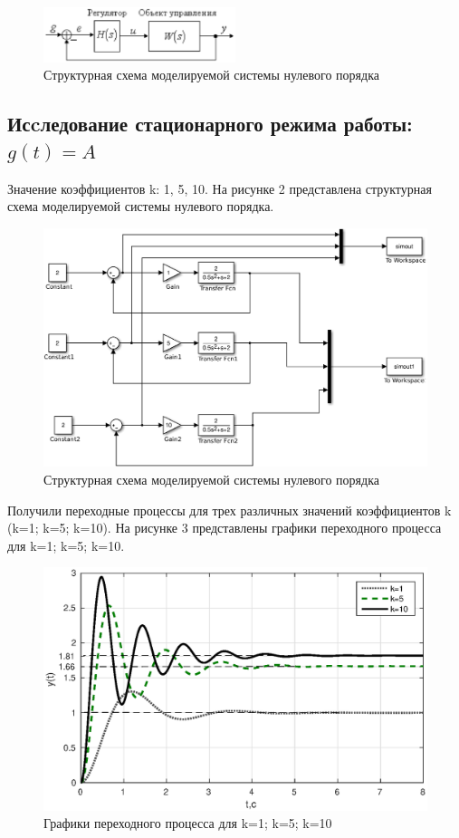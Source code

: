 \documentclass[12pt,a4paper]{article}
\begin{document}
\begin{figure}[h!]
\centering
\includegraphics[width=0.5\textwidth]{1/22.eps} 
\caption{Структурная схема моделируемой  системы нулевого порядка}
\end{figure}

\subsection{Исcледование стационарного режима работы: $g(t)=A$}

Значение коэффициентов k: 1, 5, 10.
На рисунке 2 представлена структурная схема моделируемой системы нулевого порядка.
\begin{figure}[h!]
\centering
\includegraphics[width=\textwidth]{1/1_1.eps} 
\caption{Структурная схема моделируемой  системы нулевого порядка}
\end{figure}

Получили переходные процессы для трех различных значений коэффициентов k (k=1; k=5; k=10).
На рисунке 3 представлены графики переходного процесса для k=1; k=5; k=10.
\begin{figure}[H]
\centering
\includegraphics[width=\textwidth]{1/1_1y(t).eps}
\caption{Графики переходного процесса для k=1; k=5; k=10}
\end{figure}
\end{document}
